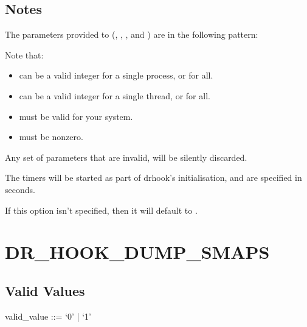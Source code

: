 \documentclass[letterpaper,10pt,english]{sphinxmanual}
\begin{document}
\subsection{Notes}
\label{\detokenize{flag/flag:id182}}
\sphinxAtStartPar
The parameters provided to  (, , , and ) are in the following pattern:

\sphinxAtStartPar
{}

\sphinxAtStartPar
Note that:
\begin{itemize}
\item {} 
\sphinxAtStartPar
{} can be a valid integer for a single process, or  for all.

\item {} 
\sphinxAtStartPar
{} can be a valid integer for a single thread, or  for all.

\item {} 
\sphinxAtStartPar
{} must be valid for your system.

\item {} 
\sphinxAtStartPar
{} must be non\sphinxhyphen{}zero.

\end{itemize}

\sphinxAtStartPar
Any set of parameters that are invalid, will be silently discarded.

\sphinxAtStartPar
The timers will be started as part of drhook’s initialisation, and are specified in seconds.

\sphinxAtStartPar
If this option isn’t specified, then it will default to .


\section{DR\_HOOK\_DUMP\_SMAPS}
\label{\detokenize{flag/flag:dr-hook-dump-smaps}}\label{\detokenize{flag/flag:id184}}

\subsection{Valid Values}
\label{\detokenize{flag/flag:id185}}
\begin{DUlineblock}{0em}
\item[] valid\_value ::= ‘0’ | ‘1’
\end{DUlineblock}
\end{document}
